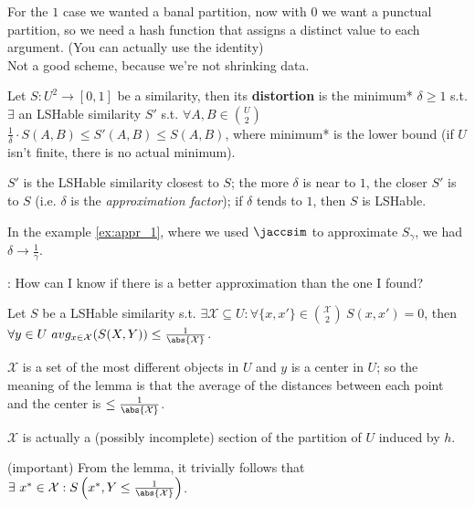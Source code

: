	For the $1$ case we wanted a banal partition, now with $0$ we want a punctual partition, so we need a hash function that assigns a distinct value to each argument. (You can actually use the identity) \\
	Not a good scheme, because we're not shrinking data.
	
	
	 Let $S: U^2 \to [0,1]$ be a similarity, then its \textbf{distortion} is the minimum* $\delta \geq 1$ s.t. $\exists$ an LSHable similarity $S'$ s.t. $\forall {A, B} \in \binom{U}{2}$ $\frac{1}{\delta} \cdot S(A, B) \leq S'(A, B) \leq S(A, B)$, where minimum* is the lower bound (if $U$ isn't finite, there is no actual minimum).
	
	\obs $S'$ is the LSHable similarity closest to $S$; the more $\delta$ is near to $1$, the closer $S'$ is to $S$ (i.e. $\delta$ is the \textit{approximation factor}); if $\delta$ tends to $1$, then $S$ is LSHable.
	
	\ex \label{ex:appr_2} In the example \ref{ex:appr_1}, where we used $\jaccsim$ to approximate $S_\gamma$, we had $\delta \to \frac{1}{\gamma}$.
	
	\qst: How can I know if there is a better approximation than the one I found?
	
	 \label{l:center} Let $S$ be a LSHable similarity s.t. $\exists \mathcal{X} \subseteq U : \forall \{x, x'\} \in \binom{\mathcal{X}}{2} \ S(x, x')=0$, then $\forall y \in U \ avg_{x \in \mathcal{X}}(S(X, Y)) \leq \frac{1}{\abs{\mathcal{X}}}$.
	
	\obs $\mathcal{X}$ is a set of the most different objects in $U$ and $y$ is a center in $U$; so the meaning of the lemma is that the average of the distances between each point and the center is $\leq \frac{1}{\abs{\mathcal{X}}}$.
	
	\obs $\mathcal{X}$ is actually a (possibly incomplete) section of the partition of $U$ induced by $h$.
	
	\obs (important) From the lemma, it trivially follows that $\exists \ x^* \in \mathcal{X} : S\left(x^*, Y \leq \frac{1}{\abs{\mathcal{X}}}\right)$.
	
